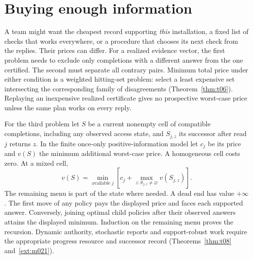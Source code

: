\section{Buying enough information}\label{sec:acq}
A team might want the cheapest record supporting \emph{this} installation, a fixed list of checks that works everywhere, or a procedure that chooses its next check from the replies. Their prices can differ. For a realized evidence vector, the first problem needs to exclude only completions with a different answer from the one certified. The second must separate all contrary pairs. Minimum total price under either condition is a weighted hitting-set problem: select a least expensive set intersecting the corresponding family of disagreements (Theorem~\ref{thm:t06}). Replaying an inexpensive realized certificate gives no prospective worst-case price unless the same plan works on every reply.

For the third problem let \(S\) be a current nonempty cell of compatible completions, including any observed access state, and \(S_{j,z}\) its successor after read \(j\) returns \(z\). In the finite once-only positive-information model let \(c_j\) be its price and \(v(S)\) the minimum additional worst-case price. A homogeneous cell costs zero. At a mixed cell,
\[
 v(S)=\min_{\text{available }j}
       \left[c_j+\max_{z:S_{j,z}\ne\varnothing}v(S_{j,z})\right].
\]
The remaining menu is part of the state where needed. A dead end has value \(+\infty\). The first move of any policy pays the displayed price and faces each supported answer. Conversely, joining optimal child policies after their observed answers attains the displayed minimum. Induction on the remaining menu proves the recursion. Dynamic authority, stochastic reports and support-robust work require the appropriate progress resource and successor record (Theorems~\ref{thm:t08} and~\ref{ext:m021}).

